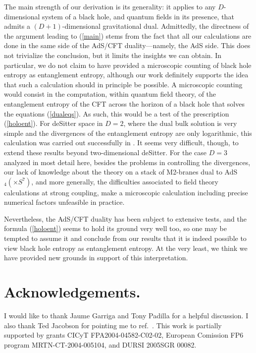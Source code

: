 \documentclass[12pt]{article}
\newcommand{\reef}[1]{(\ref{#1})}
\begin{document}
The main strength of our derivation is its generality: it applies to any
$D$-dimensional system of a black hole, and quantum fields in its
presence, that admits a $(D+1)$-dimensional gravitational dual.
Admittedly, the directness of the argument leading to \reef{main} stems
from the fact that all our calculations are done in the same side of the
AdS/CFT duality---namely, the AdS side. This does not trivialize the
conclusion, but it limits the insights we can obtain. In particular, we
do not claim to have provided a microscopic counting of black hole
entropy as entanglement entropy, although our work definitely supports
the idea that such a calculation should in principle be possible. A
microscopic counting would consist in the computation, within quantum
field theory, of the entanglement entropy of the CFT across the horizon
of a black hole that solves the equations \reef{dualeqs}. As such, this
would be a test of the prescription \reef{holoent}. For deSitter space
in $D=2$, where the dual bulk solution is very simple and the
divergences of the entanglement entropy are only logarithmic, this
calculation was carried out successfully in \cite{hms}. It seems very
difficult, though, to extend these results beyond two-dimensional
deSitter. For the case $D=3$ analyzed in most detail here, besides the
problems in controlling the divergences, our lack of knowledge about the
theory on a stack of M2-branes dual to AdS$_4 (\times S^7)$, and more
generally, the difficulties associated to field theory calculations at
strong coupling, make a microscopic calculation including precise
numerical factors unfeasible in practice. 

Nevertheless, the AdS/CFT duality has been subject to extensive tests,
and the formula \reef{holoent} seems to hold its ground very well too,
so one may be tempted to assume it and conclude from our results that it
is indeed possible to view black hole entropy as entanglement entropy.
At the very least, we think we have provided new grounds in support of
this interpretation. 




\section{Acknowledgements.} I would like to thank Jaume Garriga
and Tony Padilla for a helpful discussion. I also thank Ted Jacobson for
pointing me to ref.~\cite{hms}. This work is partially supported by
grants CICyT FPA2004-04582-C02-02, European Comission FP6 program
MRTN-CT-2004-005104, and DURSI 2005SGR 00082.
\end{document}
